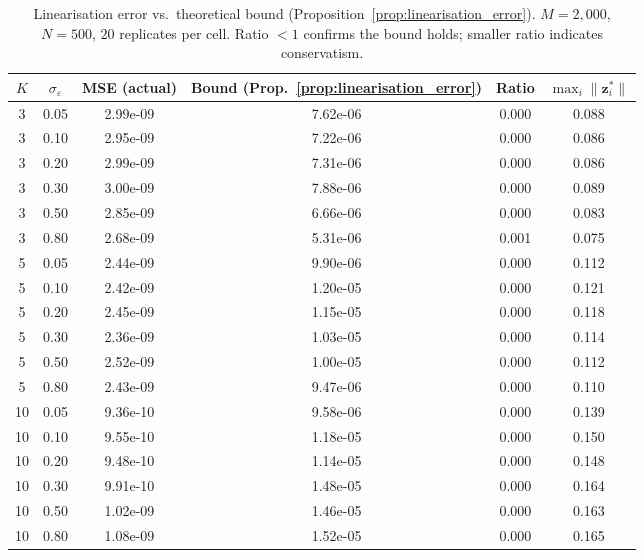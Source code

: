 \begin{table}[t]
\centering
\caption{Linearisation error vs.\ theoretical bound (Proposition~\ref{prop:linearisation_error}). $M=2,000$, $N=500$, $20$ replicates per cell. Ratio $< 1$ confirms the bound holds; smaller ratio indicates conservatism.}
\label{tab:block2}
\begin{tabular}{cccccc}
\toprule
$K$ & $\sigma_\varepsilon$ & MSE (actual) & Bound (Prop.~\ref{prop:linearisation_error}) & Ratio & $\max_i\|\mathbf{z}_i^*\|$ \\
\midrule
3 & 0.05 & 2.99e-09 & 7.62e-06 & 0.000 & 0.088 \\
3 & 0.10 & 2.95e-09 & 7.22e-06 & 0.000 & 0.086 \\
3 & 0.20 & 2.99e-09 & 7.31e-06 & 0.000 & 0.086 \\
3 & 0.30 & 3.00e-09 & 7.88e-06 & 0.000 & 0.089 \\
3 & 0.50 & 2.85e-09 & 6.66e-06 & 0.000 & 0.083 \\
3 & 0.80 & 2.68e-09 & 5.31e-06 & 0.001 & 0.075 \\
5 & 0.05 & 2.44e-09 & 9.90e-06 & 0.000 & 0.112 \\
5 & 0.10 & 2.42e-09 & 1.20e-05 & 0.000 & 0.121 \\
5 & 0.20 & 2.45e-09 & 1.15e-05 & 0.000 & 0.118 \\
5 & 0.30 & 2.36e-09 & 1.03e-05 & 0.000 & 0.114 \\
5 & 0.50 & 2.52e-09 & 1.00e-05 & 0.000 & 0.112 \\
5 & 0.80 & 2.43e-09 & 9.47e-06 & 0.000 & 0.110 \\
10 & 0.05 & 9.36e-10 & 9.58e-06 & 0.000 & 0.139 \\
10 & 0.10 & 9.55e-10 & 1.18e-05 & 0.000 & 0.150 \\
10 & 0.20 & 9.48e-10 & 1.14e-05 & 0.000 & 0.148 \\
10 & 0.30 & 9.91e-10 & 1.48e-05 & 0.000 & 0.164 \\
10 & 0.50 & 1.02e-09 & 1.46e-05 & 0.000 & 0.163 \\
10 & 0.80 & 1.08e-09 & 1.52e-05 & 0.000 & 0.165 \\
\bottomrule
\end{tabular}
\end{table}

